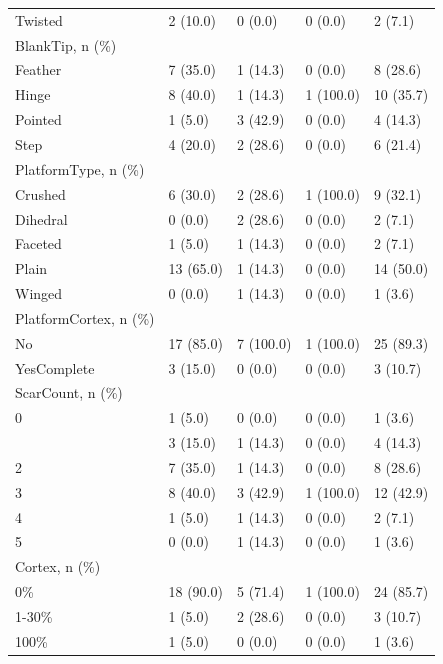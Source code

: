 \documentclass[12pt,twoside]{reedthesis}
\begin{document}
\begin{longtable}[t]{lllll}
Twisted & 2 (10.0) & 0 (0.0) & 0 (0.0) & 2 (7.1)\\
BlankTip, n (\%) &  &  &  & \\
\addlinespace
Feather & 7 (35.0) & 1 (14.3) & 0 (0.0) & 8 (28.6)\\
Hinge & 8 (40.0) & 1 (14.3) & 1 (100.0) & 10 (35.7)\\
Pointed & 1 (5.0) & 3 (42.9) & 0 (0.0) & 4 (14.3)\\
Step & 4 (20.0) & 2 (28.6) & 0 (0.0) & 6 (21.4)\\
PlatformType, n (\%) &  &  &  & \\
\addlinespace
Crushed & 6 (30.0) & 2 (28.6) & 1 (100.0) & 9 (32.1)\\
Dihedral & 0 (0.0) & 2 (28.6) & 0 (0.0) & 2 (7.1)\\
Faceted & 1 (5.0) & 1 (14.3) & 0 (0.0) & 2 (7.1)\\
Plain & 13 (65.0) & 1 (14.3) & 0 (0.0) & 14 (50.0)\\
Winged & 0 (0.0) & 1 (14.3) & 0 (0.0) & 1 (3.6)\\
\addlinespace
PlatformCortex, n (\%) &  &  &  & \\
No & 17 (85.0) & 7 (100.0) & 1 (100.0) & 25 (89.3)\\
YesComplete & 3 (15.0) & 0 (0.0) & 0 (0.0) & 3 (10.7)\\
ScarCount, n (\%) &  &  &  & \\
0 & 1 (5.0) & 0 (0.0) & 0 (0.0) & 1 (3.6)\\
\addlinespace
1 & 3 (15.0) & 1 (14.3) & 0 (0.0) & 4 (14.3)\\
2 & 7 (35.0) & 1 (14.3) & 0 (0.0) & 8 (28.6)\\
3 & 8 (40.0) & 3 (42.9) & 1 (100.0) & 12 (42.9)\\
4 & 1 (5.0) & 1 (14.3) & 0 (0.0) & 2 (7.1)\\
5 & 0 (0.0) & 1 (14.3) & 0 (0.0) & 1 (3.6)\\
\addlinespace
Cortex, n (\%) &  &  &  & \\
0\% & 18 (90.0) & 5 (71.4) & 1 (100.0) & 24 (85.7)\\
1-30\% & 1 (5.0) & 2 (28.6) & 0 (0.0) & 3 (10.7)\\
100\% & 1 (5.0) & 0 (0.0) & 0 (0.0) & 1 (3.6)\\*
\end{longtable}
\endgroup{}

\newpage
\end{document}
